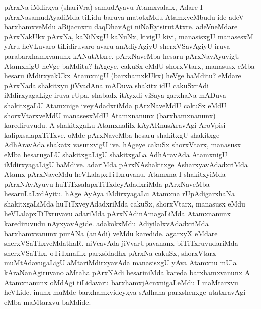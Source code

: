 \begin{artha}
pArxNa iMdirxya (shariVra) samudAyavu Atamxvalalx, Adare I pArxNasamudAyadiMda tiLidu baruva matotxMdu AtamxveMbudu ide adeV barxhamxveMdu aBijacnxru daqDhavAgi niNaRyisirutAtxre. adeVneMdare pArxNakUkx pArxNa, kaNiNxgU kaNuNx, kivigU kivi, manasisxgU manasesxM yAru heVLuvaro tiLidiruvaro avaru anAdiyAgiyU sherxVSavAgiyU iruva  parabarxhamxvanunx kANutAtxre. pArxNaveMba hesaru pArxNavAyuvigU AtamxnigU heVge baMditu? hAgeye, cakuSx eMdU shorxVtarx, manasusx eMba hesaru iMdirxyakUkx AtamxnigU (barxhamxkUkx) heVge baMditu? eMdare pArxNada shakitxyu jiVvadAna mADuva shakitx idU cakuSxrAdi iMdirxyagaLige iruva rUpa, shabadx itAyxdi viSaya garxhaNa mADuva shakitxgaLU Atamxnige iveyAdadxriMda pArxNaveMdU cakuSx eMdU shorxVtarxveMdU manasesxMdU Atamxnanunx (barxhamxnanunx) karediruvudu. A shakitxgaLu Atamxnalilx kAyARnusAravAgi AroVpisi kalipxsalapxTiTxve. oMde pArxNaveMba hesaru shakitxgU shakitxge AdhAravAda shakatx vasutxvigU ive. hAgeye cakuSx shorxVtarx, manasusx eMba hesarugaLU shakitxgaLigU shakitxgaLa AdhAravAda AtamxnigU iMdirxyagaLigU baMdive. adariMda pArxNAshakitxge AsharxyavAdadxriMda Atamx pArxNaveMdu heVLalapxTiTxruvanu. Atamxna I shakitxyiMda pArxNAvAyuvu huTiTxsalapxTiTxdeyAdadxriMda pArxNaveMba hesaruLaLxdAyitu. hAge AyAya iMdirxyagaLu Atamxna rUpAdigarxhaNa shakitxgaLiMda huTiTxveyAdadxriMda cakuSx, shorxVtarx, manasusx eMdu heVLalapxTiTxruvavu adariMda pArxNAdinAmagaLiMda Atamxnanunx karediruvudu nAyxyavAgide. adakokxMdu AdiyilalxvAdadxriMda barxhamxvanunx purANa (anAdi) veMdu karedide. agarxyX eMdare sherxVSaThxveMdathaR. niVcavAda jiVvarUpavananx biTiTxruvudariMda sherxVSaThx. oTiTxnalilx parxsidadhx pArxNa-cakuSx, shorxVtarx muMtAdavugaLigU aMtariMdirxyavAda manasisxgU yAva Atamxnu mUla kAraNanAgiruvano aMtaha pArxNAdi hesariniMda kareda barxhamxvanunx A Atamxnanunx oMdAgi tiLidavaru barxhamxjAcnxnigaLeMdu I maMtarxvu heVLide. inunx muMde barxhamxvideyxya sAdhana parxshenxge utatxravAgi ---- eMba maMtarxvu baMdide.
\end{artha}


